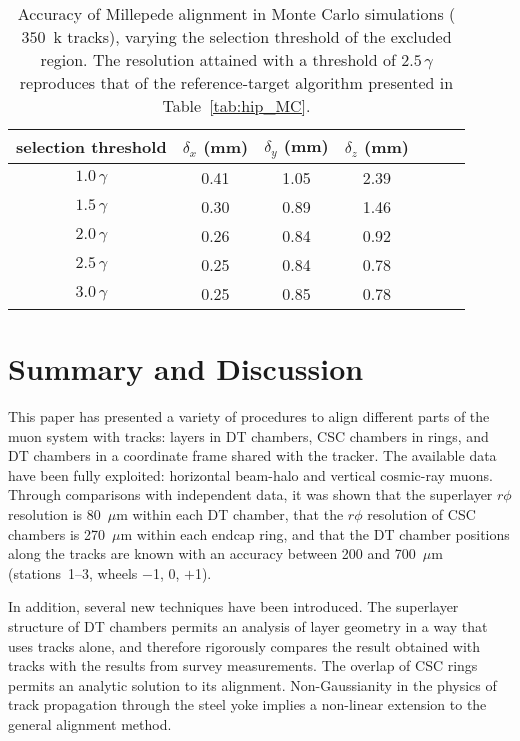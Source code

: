 \documentclass[11pt,twoside,a4paper,cmspaper]{cms-tdr}
\begin{document}
\begin{table}
\caption{Accuracy of Millepede alignment in Monte Carlo simulations ($350$~k tracks), varying the selection threshold of the
excluded region.  The resolution attained with a threshold of
$2.5 \, \gamma$ reproduces that of the reference-target
algorithm presented in
Table~\ref{tab:hip_MC}. \label{tab:tailstudy}}
\renewcommand{\arraystretch}{1.5}
\begin{center}
\begin{tabular}{c | c c c c c c}
\hline\hline selection threshold & $\delta_x$ (mm) & $\delta_y$ (mm) & $\delta_z$ (mm) \\\hline
$1.0 \, \gamma$ & 0.41 & 1.05 & 2.39 \\
$1.5 \, \gamma$ & 0.30 & 0.89 & 1.46 \\
$2.0 \, \gamma$ & 0.26 & 0.84 & 0.92 \\
$2.5 \, \gamma$ & 0.25 & 0.84 & 0.78 \\
$3.0 \, \gamma$ & 0.25 & 0.85 & 0.78 \\\hline\hline
\end{tabular}
\end{center}
\end{table}

\section{Summary and Discussion}

This paper has presented a variety of procedures to align
different parts of the muon system with tracks: layers in DT chambers,
CSC chambers in rings, and DT chambers in a coordinate frame shared
with the tracker.  The available data have been fully exploited:
horizontal beam-halo and vertical cosmic-ray muons.  Through
comparisons with independent data, it was shown that the superlayer
$r\phi$ resolution is 80~$\mu$m within each DT chamber, that the
$r\phi$ resolution of CSC chambers is 270~$\mu$m within each endcap
ring, and that the DT chamber positions along the tracks are known
with an accuracy between 200 and 700~$\mu$m (stations~1--3, wheels $-$1, 0,
$+$1).

In addition, several new techniques have been introduced.  The
superlayer structure of DT chambers permits an analysis of layer
geometry in a way that uses tracks alone, and therefore rigorously
compares the result obtained with tracks with the results from survey
measurements.  The overlap of CSC rings permits an analytic solution
to its alignment.  Non-Gaussianity in the physics of track propagation through the steel
yoke implies a non-linear extension to the general alignment method.
\end{document}
